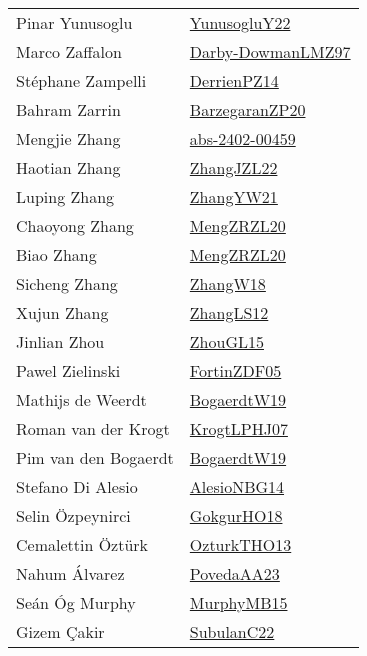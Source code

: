{\begin{longtable}{p{4cm}p{20cm}}
Pinar Yunusoglu & \href{articles/YunusogluY22.pdf}{YunusogluY22}\cite{YunusogluY22} \\
Marco Zaffalon & \href{articles/Darby-DowmanLMZ97.pdf}{Darby-DowmanLMZ97}\cite{Darby-DowmanLMZ97} \\
St{\'{e}}phane Zampelli & \href{papers/DerrienPZ14.pdf}{DerrienPZ14}\cite{DerrienPZ14} \\
Bahram Zarrin & \href{papers/BarzegaranZP20.pdf}{BarzegaranZP20}\cite{BarzegaranZP20} \\
Mengjie Zhang & \href{articles/abs-2402-00459.pdf}{abs-2402-00459}\cite{abs-2402-00459} \\
Haotian Zhang & \href{papers/ZhangJZL22.pdf}{ZhangJZL22}\cite{ZhangJZL22} \\
Luping Zhang & \href{articles/ZhangYW21.pdf}{ZhangYW21}\cite{ZhangYW21} \\
Chaoyong Zhang & \href{articles/MengZRZL20.pdf}{MengZRZL20}\cite{MengZRZL20} \\
Biao Zhang & \href{articles/MengZRZL20.pdf}{MengZRZL20}\cite{MengZRZL20} \\
Sicheng Zhang & \href{articles/ZhangW18.pdf}{ZhangW18}\cite{ZhangW18} \\
Xujun Zhang & \href{papers/ZhangLS12.pdf}{ZhangLS12}\cite{ZhangLS12} \\
Jinlian Zhou & \href{papers/ZhouGL15.pdf}{ZhouGL15}\cite{ZhouGL15} \\
Pawel Zielinski & \href{papers/FortinZDF05.pdf}{FortinZDF05}\cite{FortinZDF05} \\
Mathijs de Weerdt & \href{papers/BogaerdtW19.pdf}{BogaerdtW19}\cite{BogaerdtW19} \\
Roman van der Krogt & \href{papers/KrogtLPHJ07.pdf}{KrogtLPHJ07}\cite{KrogtLPHJ07} \\
Pim van den Bogaerdt & \href{papers/BogaerdtW19.pdf}{BogaerdtW19}\cite{BogaerdtW19} \\
Stefano {Di Alesio} & \href{papers/AlesioNBG14.pdf}{AlesioNBG14}\cite{AlesioNBG14} \\
Selin {\"{O}}zpeynirci & \href{articles/GokgurHO18.pdf}{GokgurHO18}\cite{GokgurHO18} \\
Cemalettin {\"{O}}zt{\"{u}}rk & \href{articles/OzturkTHO13.pdf}{OzturkTHO13}\cite{OzturkTHO13} \\
Nahum {\'{A}}lvarez & \href{papers/PovedaAA23.pdf}{PovedaAA23}\cite{PovedaAA23} \\
Se{\'{a}}n {\'{O}}g Murphy & \href{papers/MurphyMB15.pdf}{MurphyMB15}\cite{MurphyMB15} \\
Gizem {\c{C}}akir & \href{articles/SubulanC22.pdf}{SubulanC22}\cite{SubulanC22} \\
\end{longtable}
}


